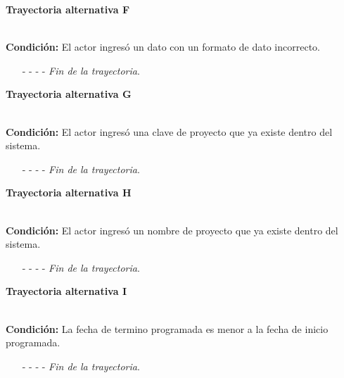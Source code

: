 \hypertarget{CU2-1:TAF}{\textbf{Trayectoria alternativa F}}\\
\noindent \textbf{Condición:} El actor ingresó un dato con un formato de dato incorrecto.
\begin{enumerate}
	\UCpaso[\UCsist] Muestra el mensaje  señalando el campo que presenta el error en la pantalla .
	\UCpaso Regresa al paso \ref{CU2.1-P5} de la trayectoria principal.
	\item[- -] - - {\em {Fin de la trayectoria}}.
\end{enumerate}
\hypertarget{CU2-1:TAG}{\textbf{Trayectoria alternativa G}}\\
\noindent \textbf{Condición:} El actor ingresó una clave de proyecto que ya existe dentro del sistema.
\begin{enumerate}
	\UCpaso[\UCsist] Muestra el mensaje  señalando el campo que presenta la duplicidad en la pantalla .
	\UCpaso Regresa al paso \ref{CU2.1-P5} de la trayectoria principal.
	\item[- -] - - {\em {Fin de la trayectoria}}.
\end{enumerate}
\hypertarget{CU2-1:TAH}{\textbf{Trayectoria alternativa H}}\\
\noindent \textbf{Condición:} El actor ingresó un nombre de proyecto que ya existe dentro del sistema.
\begin{enumerate}
	\UCpaso[\UCsist] Muestra el mensaje  señalando el campo que presenta la duplicidad en la pantalla .
	\UCpaso Regresa al paso \ref{CU2.1-P5} de la trayectoria principal.
	\item[- -] - - {\em {Fin de la trayectoria}}.
\end{enumerate}
\hypertarget{CU2-1:TAI}{\textbf{Trayectoria alternativa I}}\\
\noindent \textbf{Condición:} La fecha de termino programada es menor a la fecha de inicio programada.
\begin{enumerate}
	\UCpaso[\UCsist] Muestra el mensaje  en el campo de fecha de término programada en la pantalla .
	\UCpaso Regresa al paso \ref{CU2.1-P5} de la trayectoria principal.
	\item[- -] - - {\em {Fin de la trayectoria}}.
\end{enumerate}